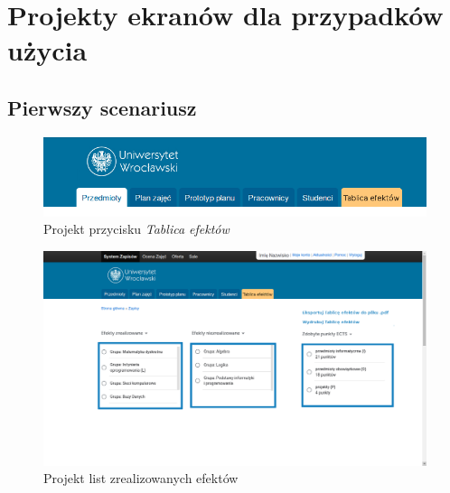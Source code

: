\documentclass{article}
\begin{document}
\afterpage{\null\newpage}
\newpage


\section{Projekty ekranów dla przypadków użycia}
\subsection{Pierwszy scenariusz}
\begin{figure}[H]
	\begin{center}
		\caption{Projekt przycisku \textit{Tablica efektów}}
		\includegraphics[scale=0.45]{te.png}
	\end{center}
\end{figure}

\begin{figure}[H]
	\begin{center}
		\caption{Projekt list zrealizowanych efektów}
		\includegraphics[scale=0.23]{tabl.png}
	\end{center}
\end{figure}
\end{document}

